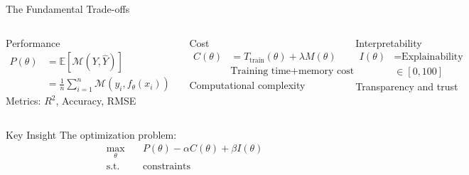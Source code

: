 \documentclass[aspectratio=169,10pt]{beamer}
\begin{document}
\begin{frame}{The Fundamental Trade-offs}

\vspace{0.0cm}

\begin{columns}
\begin{block}{\textcolor{mlcolor}{Performance}}
\begin{align*}
P(\theta) &= \mathbb{E}[\mathcal{M}(Y, \hat{Y})] \\
&= \frac{1}{n}\sum_{i=1}^n \mathcal{M}(y_i, f_\theta(x_i))
\end{align*}
Metrics: $R^2$, Accuracy, RMSE
\end{block}

\begin{block}{\textcolor{statcolor}{Cost}}
\begin{align*}
C(\theta) &= T_{\text{train}}(\theta) + \lambda M(\theta) \\
&\text{Training time} + \text{memory cost}
\end{align*}
Computational complexity
\end{block}

\begin{block}{\textcolor{accentcolor}{Interpretability}}
\begin{align*}
I(\theta) &= \text{Explainability Score} \\
&\in [0, 100]
\end{align*}
Transparency and trust
\end{block}
\end{columns}

\vspace{0.0cm}

\begin{alertblock}{Key Insight}
The optimization problem:
\begin{align*}
\max_\theta \quad &P(\theta) - \alpha C(\theta) + \beta I(\theta) \\
\text{s.t. } &\text{constraints}
\end{align*}
\end{alertblock}
\end{frame}
\end{document}
